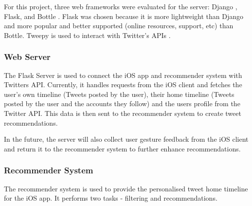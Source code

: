 \documentclass{article}
\begin{document}
For this project, three web frameworks were evaluated for the server: Django \cite{django}, Flask, and Bottle \cite{bottle}. Flask was chosen because it is more lightweight than Django and more popular and better supported (online resources, support, etc) than Bottle. Tweepy is used to interact with Twitter's APIs \cite{tweepy}.


\subsubsection*{Web Server}

The Flask Server is used to connect the iOS app and recommender system with Twitters API. Currently, it handles requests from the iOS client and fetches the user's own timeline (Tweets posted by the user), their home timeline (Tweets posted by the user and the accounts they follow) and the users profile from the Twitter API. This data is then sent to the recommender system to create tweet recommendations.

In the future, the server will also collect user gesture feedback from the iOS client and return it to the recommender system to further enhance recommendations.
\subsubsection*{Recommender System}
The recommender system is used to provide the personalised tweet home timeline for the iOS app. It performs two tasks - filtering and recommendations. 
\end{document}
